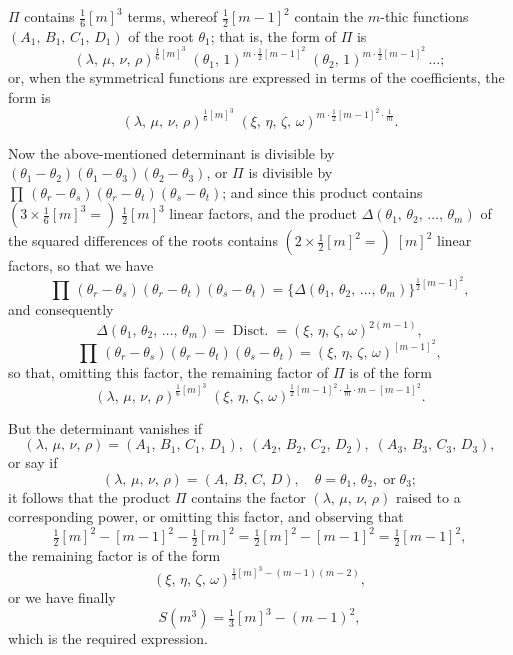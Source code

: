 \documentclass[11pt,a4paper]{article}
\providecommand{\Disct}{\operatorname{Disct.}}
\begin{document}
\medskip

$\Pi$ contains $\tfrac{1}{6}[m]^3$ terms, whereof $\tfrac{1}{2}[m-1]^2$ contain the $m$-thic functions $(A_1,\,B_1,\,C_1,\,D_1)$ of the root $\theta_1$; that is, the form of $\Pi$ is
\[
(\lambda,\,\mu,\,\nu,\,\rho)^{\tfrac{1}{6}[m]^3}\;(\theta_1,\,1)^{m \cdot \tfrac{1}{2}[m-1]^2}\;(\theta_2,\,1)^{m \cdot \tfrac{1}{2}[m-1]^2}\,\ldots;
\]
or, when the symmetrical functions are expressed in terms of the coefficients, the form is
\[
(\lambda,\,\mu,\,\nu,\,\rho)^{\tfrac{1}{6}[m]^3}\;(\xi,\,\eta,\,\zeta,\,\omega)^{m \cdot \tfrac{1}{2}[m-1]^2 \cdot \tfrac{1}{m}}.
\]

\medskip

Now the above-mentioned determinant is divisible by $(\theta_1 - \theta_2)(\theta_1 - \theta_3)(\theta_2 - \theta_3)$, or $\Pi$ is divisible by $\prod\,(\theta_r - \theta_s)(\theta_r - \theta_t)(\theta_s - \theta_t)$; and since this product contains $(3 \times \tfrac{1}{6}[m]^3 =)\;\tfrac{1}{2}[m]^3$ linear factors, and the product $\Delta(\theta_1,\,\theta_2,\,\ldots,\,\theta_m)$ of the squared differences of the roots contains $(2 \times \tfrac{1}{2}[m]^2 =)\;[m]^2$ linear factors, so that we have
\[
\prod\,(\theta_r - \theta_s)(\theta_r - \theta_t)(\theta_s - \theta_t) = \bigl\{\Delta(\theta_1,\,\theta_2,\,\ldots,\,\theta_m)\bigr\}^{\tfrac{1}{2}[m-1]^2},
\]
and consequently
\[
\Delta(\theta_1,\,\theta_2,\,\ldots,\,\theta_m) = \Disct = (\xi,\,\eta,\,\zeta,\,\omega)^{2(m-1)},
\]
\[
\prod\,(\theta_r - \theta_s)(\theta_r - \theta_t)(\theta_s - \theta_t) = (\xi,\,\eta,\,\zeta,\,\omega)^{[m-1]^2},
\]
so that, omitting this factor, the remaining factor of $\Pi$ is of the form
\[
(\lambda,\,\mu,\,\nu,\,\rho)^{\tfrac{1}{6}[m]^3}\;(\xi,\,\eta,\,\zeta,\,\omega)^{\tfrac{1}{2}[m-1]^2 \cdot \tfrac{1}{m} \cdot m - [m-1]^2}.
\]

\medskip

But the determinant vanishes if
\[
(\lambda,\,\mu,\,\nu,\,\rho) = (A_1,\,B_1,\,C_1,\,D_1),\;(A_2,\,B_2,\,C_2,\,D_2),\;(A_3,\,B_3,\,C_3,\,D_3),
\]
or say if
\[
(\lambda,\,\mu,\,\nu,\,\rho) = (A,\,B,\,C,\,D),\quad \theta = \theta_1,\,\theta_2,\;\text{or}\;\theta_3;
\]
it follows that the product $\Pi$ contains the factor $(\lambda,\,\mu,\,\nu,\,\rho)$ raised to a corresponding power, or omitting this factor, and observing that
\[
\tfrac{1}{2}[m]^2 - [m-1]^2 - \tfrac{1}{2}[m]^2 = \tfrac{1}{2}[m]^2 - [m-1]^2 = \tfrac{1}{2}[m-1]^2,
\]
the remaining factor is of the form
\[
(\xi,\,\eta,\,\zeta,\,\omega)^{\tfrac{1}{3}[m]^3 - (m-1)(m-2)},
\]
or we have finally
\[
S(m^3) = \tfrac{1}{3}[m]^3 - (m-1)^2,
\]
which is the required expression.
\end{document}
